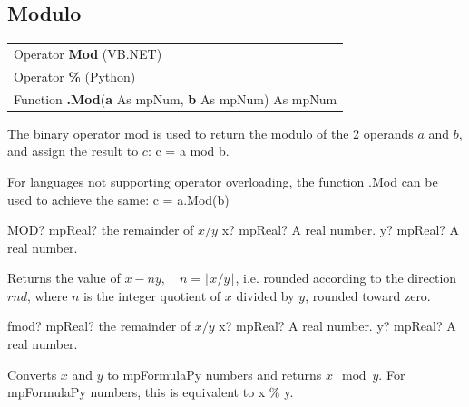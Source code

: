 \subsection{Modulo }
\begin{tabular}{p{481pt}}
	\toprule
	\textsf{Operator \textbf{Mod}} (VB.NET)\index{Multiprecision Functions!mod} \\
	\textsf{Operator \textbf{\%}} (Python)\index{Multiprecision Functions!mod} \\
	\midrule
	\textsf{Function \textbf{.Mod}(\textbf{a} As mpNum, \textbf{b} As mpNum) As mpNum}\index{Multiprecision Functions!.Mod} \\
	\bottomrule
\end{tabular}

\vspace{0.3cm}
The binary operator \textsf{mod} is used to return the modulo of the 2 operands $a$ and $b$, and assign the result to $c$: \textsf{c = a mod b}.

For languages not supporting operator overloading, the function \textsf{.Mod} can be used to achieve the same: \textsf{c = a.Mod(b)}



\vspace{0.6cm}

\begin{mpFunctionsExtract}
	\mpWorksheetFunctionTwoNotImplemented
	{MOD? mpReal? the remainder of $x/y$}
	{x? mpReal? A real number.}
	{y? mpReal? A real number.}
\end{mpFunctionsExtract}

\vspace{0.3cm}
Returns the value of $x-ny, \quad n=\lfloor x/y\rfloor$, i.e. rounded according to the direction $rnd$, where $n$ is the integer quotient of $x$ divided by $y$,  rounded toward zero.



\vspace{0.6cm}

\begin{mpFunctionsExtract}
	\mpFunctionTwo
	{fmod? mpReal? the remainder of $x/y$}
	{x? mpReal? A real number.}
	{y? mpReal? A real number.}
\end{mpFunctionsExtract}


Converts $x$ and $y$ to mpFormulaPy numbers and returns $x \mod y$. For mpFormulaPy numbers, this is equivalent to x \% y.

